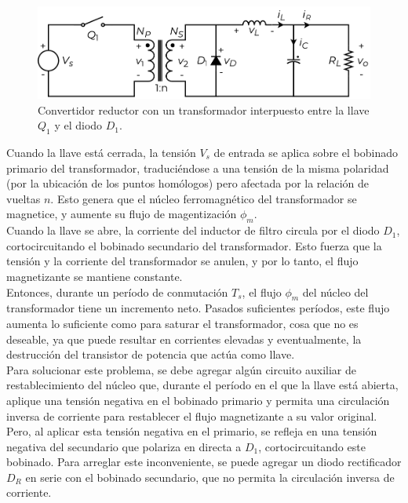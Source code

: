 \begin{figure}[h]
    \centering
    \includegraphics[scale=0.6]{Imagenes/Desarrollo Forward 1.pdf}
    \caption{Convertidor reductor con un transformador interpuesto entre la llave $Q_1$ y el diodo $D_1$.}
    \label{desarrollo_forward}
\end{figure}

Cuando la llave está cerrada, la tensión $V_s$ de entrada se aplica sobre el bobinado primario del transformador, traduciéndose a una tensión de la misma polaridad (por la ubicación de los puntos homólogos) pero afectada por la relación de vueltas $n$. Esto genera que el núcleo ferromagnético del transformador se magnetice, y aumente su flujo de magentización $\phi_m$.\\

Cuando la llave se abre, la corriente del inductor de filtro circula por el diodo $D_1$, cortocircuitando el bobinado secundario del transformador. Esto fuerza que la tensión y la corriente del transformador se anulen, y por lo tanto, el flujo magnetizante se mantiene constante.\\

Entonces, durante un período de conmutación $T_s$, el flujo $\phi_m$ del núcleo del transformador tiene un incremento neto. Pasados suficientes períodos, este flujo aumenta lo suficiente como para saturar el transformador, cosa que no es deseable, ya que puede resultar en corrientes elevadas y eventualmente, la destrucción del transistor de potencia que actúa como llave.\\

Para solucionar este problema, se debe agregar algún circuito auxiliar de restablecimiento del núcleo que, durante el período en el que la llave está abierta, aplique una tensión negativa en el bobinado primario y permita una circulación inversa de corriente para restablecer el flujo magnetizante a su valor original.\\

Pero, al aplicar esta tensión negativa en el primario, se refleja en una tensión negativa del secundario que polariza en directa a $D_1$, cortocircuitando este bobinado. Para arreglar este inconveniente, se puede agregar un diodo rectificador $D_R$ en serie con el bobinado secundario, que no permita la circulación inversa de corriente.\\

